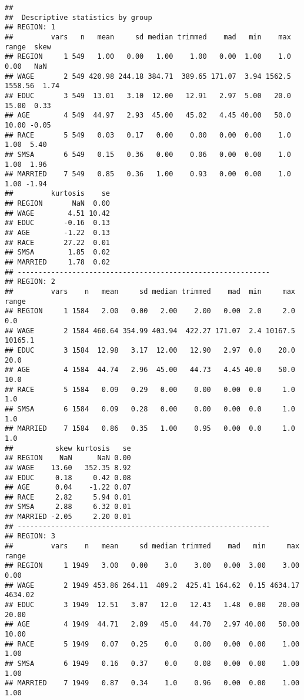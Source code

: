 \documentclass[
]{article}
\begin{document}
\begin{verbatim}
## 
##  Descriptive statistics by group 
## REGION: 1
##         vars   n   mean     sd median trimmed    mad   min    max   range  skew
## REGION     1 549   1.00   0.00   1.00    1.00   0.00  1.00    1.0    0.00   NaN
## WAGE       2 549 420.98 244.18 384.71  389.65 171.07  3.94 1562.5 1558.56  1.74
## EDUC       3 549  13.01   3.10  12.00   12.91   2.97  5.00   20.0   15.00  0.33
## AGE        4 549  44.97   2.93  45.00   45.02   4.45 40.00   50.0   10.00 -0.05
## RACE       5 549   0.03   0.17   0.00    0.00   0.00  0.00    1.0    1.00  5.40
## SMSA       6 549   0.15   0.36   0.00    0.06   0.00  0.00    1.0    1.00  1.96
## MARRIED    7 549   0.85   0.36   1.00    0.93   0.00  0.00    1.0    1.00 -1.94
##         kurtosis    se
## REGION       NaN  0.00
## WAGE        4.51 10.42
## EDUC       -0.16  0.13
## AGE        -1.22  0.13
## RACE       27.22  0.01
## SMSA        1.85  0.02
## MARRIED     1.78  0.02
## ------------------------------------------------------------ 
## REGION: 2
##         vars    n   mean     sd median trimmed    mad  min     max   range
## REGION     1 1584   2.00   0.00   2.00    2.00   0.00  2.0     2.0     0.0
## WAGE       2 1584 460.64 354.99 403.94  422.27 171.07  2.4 10167.5 10165.1
## EDUC       3 1584  12.98   3.17  12.00   12.90   2.97  0.0    20.0    20.0
## AGE        4 1584  44.74   2.96  45.00   44.73   4.45 40.0    50.0    10.0
## RACE       5 1584   0.09   0.29   0.00    0.00   0.00  0.0     1.0     1.0
## SMSA       6 1584   0.09   0.28   0.00    0.00   0.00  0.0     1.0     1.0
## MARRIED    7 1584   0.86   0.35   1.00    0.95   0.00  0.0     1.0     1.0
##          skew kurtosis   se
## REGION    NaN      NaN 0.00
## WAGE    13.60   352.35 8.92
## EDUC     0.18     0.42 0.08
## AGE      0.04    -1.22 0.07
## RACE     2.82     5.94 0.01
## SMSA     2.88     6.32 0.01
## MARRIED -2.05     2.20 0.01
## ------------------------------------------------------------ 
## REGION: 3
##         vars    n   mean     sd median trimmed    mad   min     max   range
## REGION     1 1949   3.00   0.00    3.0    3.00   0.00  3.00    3.00    0.00
## WAGE       2 1949 453.86 264.11  409.2  425.41 164.62  0.15 4634.17 4634.02
## EDUC       3 1949  12.51   3.07   12.0   12.43   1.48  0.00   20.00   20.00
## AGE        4 1949  44.71   2.89   45.0   44.70   2.97 40.00   50.00   10.00
## RACE       5 1949   0.07   0.25    0.0    0.00   0.00  0.00    1.00    1.00
## SMSA       6 1949   0.16   0.37    0.0    0.08   0.00  0.00    1.00    1.00
## MARRIED    7 1949   0.87   0.34    1.0    0.96   0.00  0.00    1.00    1.00

\end{verbatim}
\end{document}
